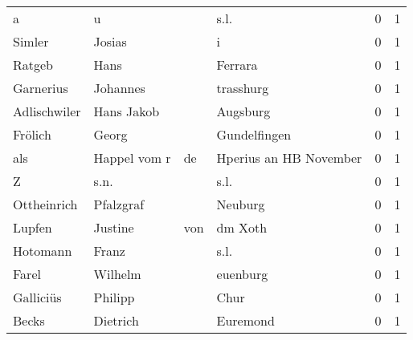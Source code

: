 \documentclass[10pt,a4paper,landscape]{article}
\begin{document}
\begin{longtable}{llllrr}
                        a &                                  u &             &                                        s.l. &          0 &         1 \\
                   Simler &                             Josias &             &                                           i &          0 &         1 \\
                   Ratgeb &                               Hans &             &                                     Ferrara &          0 &         1 \\
                Garnerius &                           Johannes &             &                                   trasshurg &          0 &         1 \\
             Adlischwiler &                         Hans Jakob &             &                                    Augsburg &          0 &         1 \\
                  Frölich &                              Georg &             &                                Gundelfingen &          0 &         1 \\
                      als &                       Happel vom r &          de &                      Hperius an HB November &          0 &         1 \\
                        Z &                               s.n. &             &                                        s.l. &          0 &         1 \\
              Ottheinrich &                          Pfalzgraf &             &                                     Neuburg &          0 &         1 \\
                   Lupfen &                            Justine &         von &                                     dm Xoth &          0 &         1 \\
                 Hotomann &                              Franz &             &                                        s.l. &          0 &         1 \\
                    Farel &                            Wilhelm &             &                                    euenburg &          0 &         1 \\
                Galliciüs &                            Philipp &             &                                        Chur &          0 &         1 \\
                    Becks &                           Dietrich &             &                                    Euremond &          0 &         1 \\

\end{longtable}
\end{document}
